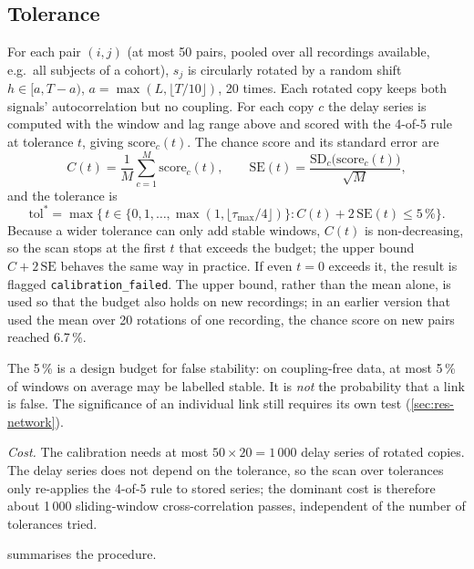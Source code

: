 \documentclass[11pt,a4paper]{article}
\begin{document}
\subsection{Tolerance}
\label{sec:tol}
For each pair $(i, j)$ (at most 50 pairs, pooled over all recordings available, e.g.\ all subjects of a cohort), $s_j$ is circularly rotated by a random shift $h \in [a, T - a)$, $a = \max(L, \lfloor T/10 \rfloor)$, 20 times. Each rotated copy keeps both signals' autocorrelation but no coupling. For each copy $c$ the delay series is computed with the window and lag range above and scored with the 4-of-5 rule at tolerance $t$, giving $\mathrm{score}_c(t)$. The chance score and its standard error are
\begin{equation}
C(t) = \frac{1}{M}\sum_{c=1}^{M} \mathrm{score}_c(t), \qquad \mathrm{SE}(t) = \frac{\mathrm{SD}_c\big(\mathrm{score}_c(t)\big)}{\sqrt{M}} ,
\end{equation}
and the tolerance is
\begin{equation}
\mathrm{tol}^\ast = \max\big\{\, t \in \{0, 1, \dots, \max(1, \lfloor\tau_{\max}/4\rfloor)\} : C(t) + 2\,\mathrm{SE}(t) \le 5\,\% \big\}.
\label{eq:tol}
\end{equation}
Because a wider tolerance can only add stable windows, $C(t)$ is non-decreasing, so the scan stops at the first $t$ that exceeds the budget; the upper bound $C + 2\,\mathrm{SE}$ behaves the same way in practice. If even $t = 0$ exceeds it, the result is flagged \texttt{calibration\_failed}. The upper bound, rather than the mean alone, is used so that the budget also holds on new recordings; in an earlier version that used the mean over 20 rotations of one recording, the chance score on new pairs reached 6.7\,\%.

The 5\,\% is a design budget for false stability: on coupling-free data, at most 5\,\% of windows on average may be labelled stable. It is \emph{not} the probability that a link is false. The significance of an individual link still requires its own test (\cref{sec:res-network}).

\emph{Cost.} The calibration needs at most $50 \times 20 = 1\,000$ delay series of rotated copies. The delay series does not depend on the tolerance, so the scan over tolerances only re-applies the 4-of-5 rule to stored series; the dominant cost is therefore about 1\,000 sliding-window cross-correlation passes, independent of the number of tolerances tried.

 summarises the procedure.
\end{document}
